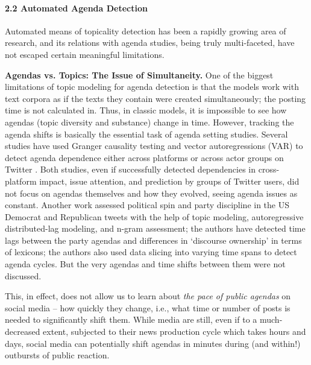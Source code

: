 \paragraph{2.2 Automated Agenda Detection}
Automated means of topicality detection has been a rapidly growing area of research, and its relations with agenda studies, being truly multi-faceted, have not escaped certain meaningful limitations.

\textbf{Agendas vs. Topics: The Issue of Simultaneity.} One of the biggest limitations of topic modeling for agenda detection is that the models work with text corpora as if the texts they contain were created simultaneously; the posting time is not calculated in. Thus, in classic models, it is impossible to see how agendas (topic diversity and substance) change in time. However, tracking the agenda shifts is basically the essential task of agenda setting studies. Several studies have used Granger causality testing and vector autoregressions (VAR) to detect agenda dependence either across platforms \cite{RussellNeumanGuggenheimMoJang} or across actor groups on Twitter \cite{BarberaCasasNagler}. Both studies, even if successfully detected dependencies in cross-platform impact, issue attention, and prediction by groups of Twitter users, did not focus on agendas themselves and how they evolved, seeing agenda issues as constant. Another work \cite{TsurCalacciLazer} assessed political spin and party discipline in the US Democrat and Republican tweets with the help of topic modeling, autoregressive distributed-lag modeling, and n-gram assessment; the authors have detected time lags between the party agendas and differences in ‘discourse ownership’ in terms of lexicons; the authors also used data slicing into varying time spans to detect agenda cycles. But the very agendas and time shifts between them were not discussed.

This, in effect, does not allow us to learn about \textit{the pace of public agendas} on social media -- how quickly they change, i.e., what time or number of posts is needed to significantly shift them. While media are still, even if to a much-decreased extent, subjected to their news production cycle which takes hours and days, social media can potentially shift agendas in minutes during (and within!) outbursts of public reaction.

